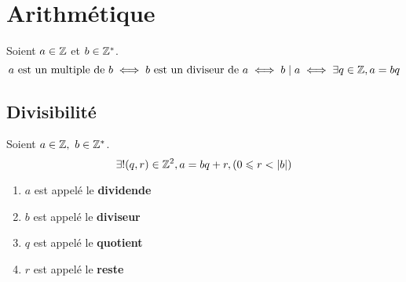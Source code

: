 \chapter{Arithmétique}
\def\arraystretch{1}

\begin{definition}
    Soient $a \in \mathbb{Z}$ et $b \in \mathbb{Z}^*$.
    \[ a \text{ est un multiple de } b \iff b \text{ est un diviseur de } a \iff b \mid a \iff \exists q \in \mathbb{Z}, a = bq \]
\end{definition}

\section{Divisibilité}

\begin{theorem}
    Soient $a \in \mathbb{Z},\ b \in \mathbb{Z}^*$.
    \[ \exists ! (q, r) \in \mathbb{Z}^2, a = bq + r, (0 \leqslant r < \abs{b}) \]
    \begin{enumerate}
    	\item $a$ est appelé le \textbf{dividende}
        \item $b$ est appelé le \textbf{diviseur}
        \item $q$ est appelé le \textbf{quotient}
        \item $r$ est appelé le \textbf{reste}
    \end{enumerate}
\end{theorem}

